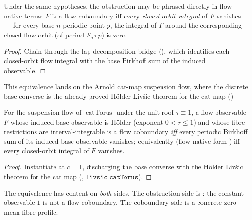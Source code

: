 \begin{theorem}\label{livsic_suspensionFlow_constRoof_orbitIntegral}
  \leanok
  Under the same hypotheses, the obstruction may be phrased directly in flow-native terms: \(F\) is a
  flow coboundary iff every \emph{closed-orbit integral} of \(F\) vanishes --- for every base
  \(n\)-periodic point \(p\), the integral of \(F\) around the corresponding closed flow orbit (of
  period \(S_n\tau\,p\)) is zero.
\end{theorem}
\begin{proof}\leanok
  Chain  through the lap-decomposition bridge
  (), which identifies each closed-orbit flow integral with the base
  Birkhoff sum of the induced observable.
\end{proof}

This equivalence lands on the Arnold cat-map suspension flow, where the discrete base converse is the
already-proved Hölder Livšic theorem for the cat map ().

\begin{theorem}\label{livsic_catSuspensionFlow}
  \leanok
  For the suspension flow of \(\operatorname{catTorus}\) under the unit roof \(\tau\equiv 1\), a flow
  observable \(F\) whose induced base observable is Hölder (exponent \(0 < r\le 1\)) and whose fibre
  restrictions are interval-integrable is a flow coboundary \emph{iff} every periodic Birkhoff sum of
  its induced base observable vanishes; equivalently (flow-native form
  ) iff every closed-orbit
  integral of \(F\) vanishes.
\end{theorem}
\begin{proof}\leanok
  Instantiate  at \(c = 1\), discharging the base converse with
  the Hölder Livšic theorem for the cat map (, \(\texttt{livsic\_catTorus}\)).
\end{proof}

The equivalence has content on \emph{both} sides. The obstruction side is
: the constant observable \(1\) is not a flow coboundary. The
coboundary side is a concrete zero-mean fibre profile.

